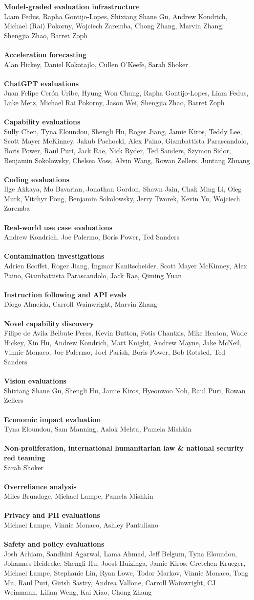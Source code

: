 \documentclass{article}
\newcommand{\creditlistheader}[1]{\textbf{#1}\footnotemark[\thefootnote]\\}
\newcommand{\creditlist}[2]{\creditlistheader{#1}#2\\
\\}
\begin{document}
\begin{multicols}{2}
\creditlist{Model-graded evaluation infrastructure}{Liam Fedus, Rapha Gontijo-Lopes, Shixiang Shane Gu, Andrew Kondrich, Michael (Rai) Pokorny, Wojciech Zaremba, Chong Zhang, Marvin Zhang, Shengjia Zhao, Barret Zoph}
\creditlist{Acceleration forecasting}{Alan Hickey, Daniel Kokotajlo, Cullen O'Keefe, Sarah Shoker}
\creditlist{ChatGPT evaluations}{Juan Felipe Cer\'on Uribe, Hyung Won Chung, Rapha Gontijo-Lopes, Liam Fedus, Luke Metz, Michael Rai Pokorny, Jason Wei, Shengjia Zhao, Barret Zoph}
\creditlist{Capability evaluations}{Sully Chen, Tyna Eloundou, Shengli Hu, Roger Jiang, Jamie Kiros, Teddy Lee, Scott Mayer McKinney, Jakub Pachocki, Alex Paino, Giambattista Parascandolo, Boris Power, Raul Puri, Jack Rae, Nick Ryder, Ted Sanders, Szymon Sidor, Benjamin Sokolowsky, Chelsea Voss, Alvin Wang, Rowan Zellers, Juntang Zhuang}
\creditlist{Coding evaluations}{Ilge Akkaya, Mo Bavarian, Jonathan Gordon, Shawn Jain, Chak Ming Li, Oleg Murk, Vitchyr Pong, Benjamin Sokolowsky, Jerry Tworek, Kevin Yu, Wojciech Zaremba}
\creditlist{Real-world use case evaluations}{Andrew Kondrich, Joe Palermo, Boris Power, Ted Sanders}
\creditlist{Contamination investigations}{Adrien Ecoffet, Roger Jiang, Ingmar Kanitscheider, Scott Mayer McKinney, Alex Paino, Giambattista Parascandolo, Jack Rae, Qiming Yuan}
\creditlist{Instruction following and API evals}{Diogo Almeida, Carroll Wainwright, Marvin Zhang}
\creditlist{Novel capability discovery}{Filipe de Avila Belbute Peres, Kevin Button, Fotis Chantzis, Mike Heaton, Wade Hickey, Xin Hu, Andrew Kondrich, Matt Knight, Andrew Mayne, Jake McNeil, Vinnie Monaco, Joe Palermo, Joel Parish, Boris Power, Bob Rotsted, Ted Sanders}
\creditlist{Vision evaluations}{Shixiang Shane Gu, Shengli Hu, Jamie Kiros, Hyeonwoo Noh, Raul Puri, Rowan Zellers}
\creditlist{Economic impact evaluation}{Tyna Eloundou, Sam Manning, Aalok Mehta, Pamela Mishkin}
\creditlist{Non-proliferation, international humanitarian law \& national security red teaming}{Sarah Shoker}
\creditlist{Overreliance analysis}{Miles Brundage, Michael Lampe, Pamela Mishkin}
\creditlist{Privacy and PII evaluations}{Michael Lampe, Vinnie Monaco, Ashley Pantuliano}
\creditlist{Safety and policy evaluations}{Josh Achiam, Sandhini Agarwal, Lama Ahmad, Jeff Belgum, Tyna Eloundou, Johannes Heidecke, Shengli Hu, Joost Huizinga, Jamie Kiros, Gretchen Krueger, Michael Lampe, Stephanie Lin, Ryan Lowe, Todor Markov, Vinnie Monaco, Tong Mu, Raul Puri, Girish Sastry, Andrea Vallone, Carroll Wainwright, CJ Weinmann, Lilian Weng, Kai Xiao, Chong Zhang}

\end{multicols}
\end{document}
